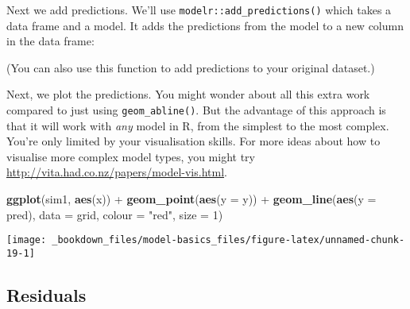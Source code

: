 \documentclass[]{book}
\newenvironment{Shaded}{\begin{snugshade}}{\end{snugshade}}
\newcommand{\KeywordTok}[1]{\textcolor[rgb]{0.13,0.29,0.53}{\textbf{{#1}}}}
\newcommand{\DataTypeTok}[1]{\textcolor[rgb]{0.13,0.29,0.53}{{#1}}}
\newcommand{\DecValTok}[1]{\textcolor[rgb]{0.00,0.00,0.81}{{#1}}}
\newcommand{\StringTok}[1]{\textcolor[rgb]{0.31,0.60,0.02}{{#1}}}
\newcommand{\CommentTok}[1]{\textcolor[rgb]{0.56,0.35,0.01}{\textit{{#1}}}}
\newcommand{\NormalTok}[1]{{#1}}
\begin{document}
Next we add predictions. We'll use \texttt{modelr::add\_predictions()}
which takes a data frame and a model. It adds the predictions from the
model to a new column in the data frame:

\begin{Shaded}
\end{Shaded}

(You can also use this function to add predictions to your original
dataset.)

Next, we plot the predictions. You might wonder about all this extra
work compared to just using \texttt{geom\_abline()}. But the advantage
of this approach is that it will work with \emph{any} model in R, from
the simplest to the most complex. You're only limited by your
visualisation skills. For more ideas about how to visualise more complex
model types, you might try
\url{http://vita.had.co.nz/papers/model-vis.html}.

\begin{Shaded}
\begin{Highlighting}[]
\KeywordTok{ggplot}\NormalTok{(sim1, }\KeywordTok{aes}\NormalTok{(x)) +}
\StringTok{  }\KeywordTok{geom_point}\NormalTok{(}\KeywordTok{aes}\NormalTok{(}\DataTypeTok{y =} \NormalTok{y)) +}
\StringTok{  }\KeywordTok{geom_line}\NormalTok{(}\KeywordTok{aes}\NormalTok{(}\DataTypeTok{y =} \NormalTok{pred), }\DataTypeTok{data =} \NormalTok{grid, }\DataTypeTok{colour =} \StringTok{"red"}\NormalTok{, }\DataTypeTok{size =} \DecValTok{1}\NormalTok{)}
\end{Highlighting}
\end{Shaded}

\begin{center}\texttt{[image: \_bookdown\_files/model-basics\_files/figure-latex/unnamed-chunk-19-1]} \end{center}

\subsection{Residuals}\label{residuals}
\end{document}
